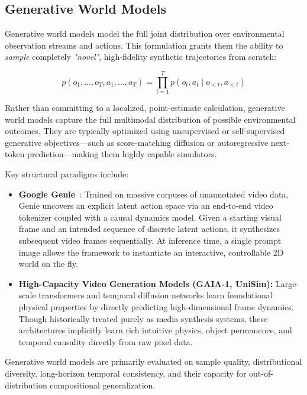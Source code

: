 \documentclass{tufte-handout}
\begin{document}
\subsection{Generative World Models}

Generative world models model the full joint distribution over environmental observation streams and actions. 
This formulation grants them the ability to \textit{sample} completely \textit{"novel"}, high-fidelity synthetic trajectories from scratch:

\begin{equation}
    p(o_1, \dots, o_T, a_1, \dots, a_T) = \prod_{t=1}^T p(o_t, a_t \mid o_{<t}, a_{<t})
    \label{eq:generative}
\end{equation}

Rather than committing to a localized, point-estimate calculation, generative world models capture the full 
multimodal distribution of possible environmental outcomes. They are typically optimized using unsupervised 
or self-supervised generative objectives—such as score-matching diffusion or autoregressive next-token 
prediction—making them highly capable simulators.

Key structural paradigms include:
\begin{itemize}
    \item \textbf{Google Genie}~\nocite{bruce2024}: Trained on massive corpuses of unannotated video data, Genie uncovers an explicit 
          latent action space via an end-to-end video tokenizer coupled with a causal dynamics model. Given a 
          starting visual frame and an intended sequence of discrete latent actions, it synthesizes subsequent video 
          frames sequentially. At inference time, a single prompt image allows the framework to instantiate an 
          interactive, controllable 2D world on the fly.

    \item \textbf{High-Capacity Video Generation Models (GAIA-1, UniSim):} Large-scale transformers and temporal 
    diffusion networks learn foundational physical properties by directly predicting high-dimensional frame dynamics. 
    Though historically treated purely as media synthesis systems, these architectures implicitly learn rich intuitive 
    physics, object permanence, and temporal causality directly from raw pixel data.

\end{itemize}

Generative world models are primarily evaluated on sample quality, distributional diversity, 
long-horizon temporal consistency, and their capacity for out-of-distribution compositional generalization.
\end{document}
